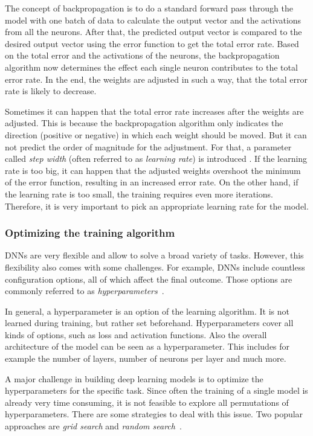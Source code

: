 The concept of backpropagation is to do a standard forward pass through the model with one batch of data to calculate the output vector and the activations from all the neurons. After that, the predicted output vector is compared to the desired output vector using the error function to get the total error rate. Based on the total error and the activations of the neurons, the backpropagation algorithm now determines the effect each single neuron contributes to the total error rate. In the end, the weights are adjusted in such a way, that the total error rate is likely to decrease.

Sometimes it can happen that the total error rate increases after the weights are adjusted. This is because the backpropagation algorithm only indicates the direction (positive or negative) in which each weight should be moved. But it can not predict the order of magnitude for the adjustment. For that, a parameter called \emph{step width} (often referred to as \emph{learning rate}) is introduced \cite[p.~169]{nn_intro96}. If the learning rate is too big, it can happen that the adjusted weights overshoot the minimum of the error function, resulting in an increased error rate. On the other hand, if the learning rate is too small, the training requires even more iterations. Therefore, it is very important to pick an appropriate learning rate for the model.

\subsubsection{Optimizing the training algorithm}
DNNs are very flexible and allow to solve a broad variety of tasks. However, this flexibility also comes with some challenges. For example, DNNs include countless configuration options, all of which affect the final outcome. Those options are commonly referred to as \emph{hyperparameters}~\cite[pp.~270ff]{praxiseinstieg_ml17}. 

In general, a hyperparameter is an option of the learning algorithm. It is not learned during training, but rather set beforehand. Hyperparameters cover all kinds of options, such as loss and activation functions. Also the overall architecture of the model can be seen as a hyperparameter. This includes for example the number of layers, number of neurons per layer and much more.

A major challenge in building deep learning models is to optimize the hyperparameters for the specific task. Since often the training of a single model is already very time consuming, it is not feasible to explore all permutations of hyperparameters. There are some strategies to deal with this issue. Two popular approaches are \emph{grid search} and \emph{random search}~\cite[pp.~73ff]{praxiseinstieg_ml17}.

